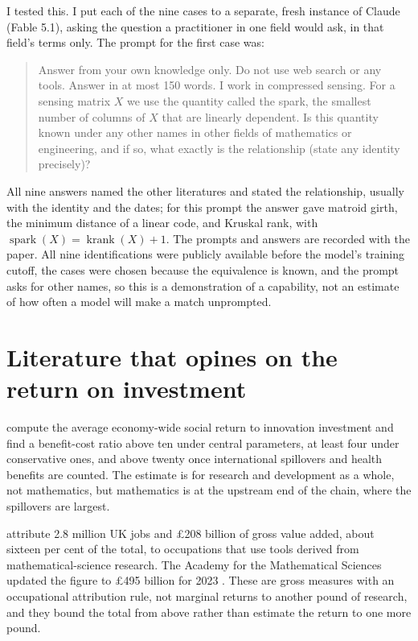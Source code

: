 \documentclass[11pt]{article}
\theoremstyle{definition}
\theoremstyle{remark}
\begin{document}
I tested this. I put each of the nine cases to a separate, fresh instance of Claude (Fable 5.1), asking the question a practitioner in one field would ask, in that field's terms only. The prompt for the first case was:
\begin{quote}
Answer from your own knowledge only. Do not use web search or any tools. Answer in at most 150 words. I work in compressed sensing. For a sensing matrix $X$ we use the quantity called the spark, the smallest number of columns of $X$ that are linearly dependent. Is this quantity known under any other names in other fields of mathematics or engineering, and if so, what exactly is the relationship (state any identity precisely)?
\end{quote}

All nine answers named the other literatures and stated the relationship, usually with the identity and the dates; for this prompt the answer gave matroid girth, the minimum distance of a linear code, and Kruskal rank, with $\operatorname{spark}(X) = \operatorname{krank}(X) + 1$. The prompts and answers are recorded with the paper. All nine identifications were publicly available before the model's training cutoff, the cases were chosen because the equivalence is known, and the prompt asks for other names, so this is a demonstration of a capability, not an estimate of how often a model will make a match unprompted.

\section{Literature that opines on the return on investment}

\citet{jones2020} compute the average economy-wide social return to innovation investment and find a benefit-cost ratio above ten under central parameters, at least four under conservative ones, and above twenty once international spillovers and health benefits are counted. The estimate is for research and development as a whole, not mathematics, but mathematics is at the upstream end of the chain, where the spillovers are largest.

\citet{deloitte2013} attribute 2.8 million UK jobs and \pounds 208 billion of gross value added, about sixteen per cent of the total, to occupations that use tools derived from mathematical-science research. The Academy for the Mathematical Sciences updated the figure to \pounds 495 billion for 2023 \citep{acadmathsci2024}. These are gross measures with an occupational attribution rule, not marginal returns to another pound of research, and they bound the total from above rather than estimate the return to one more pound.
\end{document}
